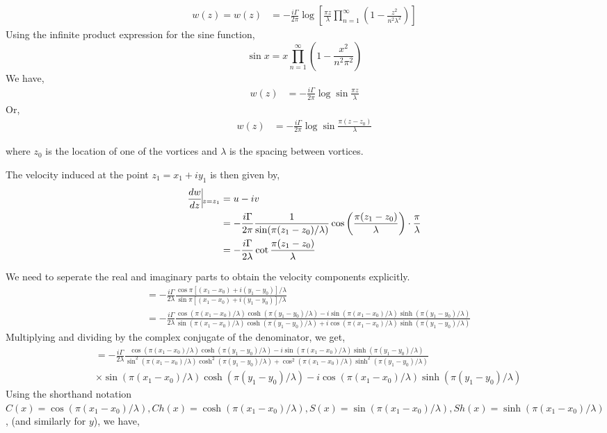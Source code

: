 \documentclass{article}
\begin{document}
\begin{align}
w(z)=w(z)&=-\frac{i\Gamma}{2\pi} \log \left[\frac{\pi z}{\lambda}\prod_{n=1}^{\infty}\left(1-\frac{z^2}{n^2\lambda^2}\right)\right]
\end{align}
Using the infinite product expression for the sine function,
\begin{equation}
\sin x = x \prod_{n=1}^{\infty}\left(1-\frac{x^2}{n^2\pi^2}\right)
\end{equation}
We have,
\begin{align}
w(z)&= -\frac{i\Gamma}{2\pi} \log \sin \frac{\pi z}{\lambda}
\end{align}
Or,
\begin{align}
w(z)&=-\frac{i\Gamma}{2\pi} \log \sin \frac{\pi (z-z_0)}{\lambda} 
\end{align}

where $z_0$ is the location of one of the vortices and $\lambda$ is the spacing between vortices.

The velocity induced at the point $z_1=x_1+iy_1$ is then given by,
\begin{align*}
\frac{dw}{dz}\vline _{z=z_1}&=u-iv \\
&= -\frac{i \Gamma }{2 \pi} \frac{1}{\sin (\pi(z_1-z_0)/\lambda)} \cos \left(\frac{\pi(z_1-z_0)}{\lambda}\right) \cdot \frac{\pi}{\lambda} \\
&= -\frac{i\Gamma}{2\lambda} \cot{\frac{\pi(z_1-z_0)}{\lambda}}
\end{align*}

We need to seperate the real and imaginary parts to obtain the velocity components explicitly.
\begin{align*}
&=-\frac{i\Gamma}{2\lambda} \frac{\cos\pi[(x_1-x_0)+i(y_1-y_0)]/\lambda}{\sin\pi[(x_1-x_0)+i(y_1-y_0)]/\lambda} \\
&=-\frac{i\Gamma}{2\lambda} \frac{\cos(\pi(x_1-x_0)/\lambda)\cosh(\pi(y_1-y_0)/\lambda)-i\sin(\pi(x_1-x_0)/\lambda)\sinh(\pi(y_1-y_0)/\lambda)}{\sin(\pi(x_1-x_0)/\lambda)\cosh(\pi(y_1-y_0)/\lambda)+i\cos(\pi(x_1-x_0)/\lambda)\sinh(\pi(y_1-y_0)/\lambda)}
\end{align*}
Multiplying and dividing by the complex conjugate of the denominator, we get,
\begin{align*}
&= -\frac{i\Gamma}{2\lambda} \frac{\cos(\pi(x_1-x_0)/\lambda)\cosh(\pi(y_1-y_0)/\lambda)-i\sin(\pi(x_1-x_0)/\lambda)\sinh(\pi(y_1-y_0)/\lambda)}{\sin^2(\pi(x_1-x_0)/\lambda)\cosh^2(\pi(y_1-y_0)/\lambda)+\cos^2(\pi(x_1-x_0)/\lambda)\sinh^2(\pi(y_1-y_0)/\lambda)}\\&\times {\sin(\pi(x_1-x_0)/\lambda)\cosh(\pi(y_1-y_0)/\lambda)-i\cos(\pi(x_1-x_0)/\lambda)\sinh(\pi(y_1-y_0)/\lambda)}
\end{align*}
Using the shorthand notation $C(x)=\cos(\pi(x_1-x_0)/\lambda),Ch(x)=\cosh(\pi(x_1-x_0)/\lambda),S(x)=\sin(\pi(x_1-x_0)/\lambda),Sh(x)=\sinh(\pi(x_1-x_0)/\lambda)$, (and similarly for $y$), we have,
\end{document}
